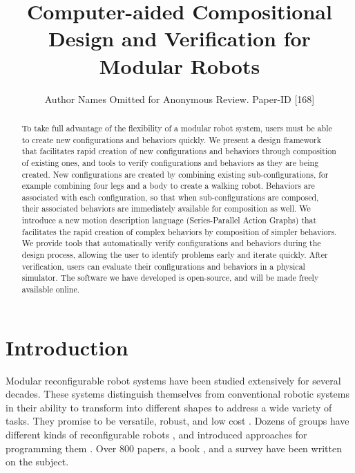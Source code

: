 \documentclass[conference]{IEEEtran}
\theoremstyle{definition}
\begin{document}
\title{Computer-aided Compositional Design and Verification for Modular Robots}

\author{Author Names Omitted for Anonymous Review. Paper-ID [168]}

\maketitle

\begin{abstract}
To take full advantage of the flexibility of a modular robot system, users must be
able to create new configurations and behaviors quickly. We present a design framework  that facilitates  rapid creation
of new configurations and behaviors through composition of existing ones, and tools
to verify configurations and behaviors as they are being created.
New configurations are created by combining existing
sub-configurations,
for example combining four legs and a body to create a walking robot.
Behaviors are associated with each configuration, so that when sub-configurations
are composed, their associated behaviors are immediately available for composition
as well.
We introduce a new motion description language (Series-Parallel Action Graphs)
that facilitates the rapid creation of complex behaviors by composition of simpler
behaviors.
We provide tools that automatically verify configurations and behaviors during the
design process, allowing the user to identify problems early and iterate quickly.
After verification, users can  evaluate their configurations and behaviors in a physical simulator.
The software we have developed is open-source, and will be made freely available
online.
\end{abstract}

\section{Introduction}
Modular reconfigurable robot systems have been studied extensively for several
decades.  These systems distinguish themselves from conventional robotic systems in their
ability to transform into different shapes to address a wide variety of tasks. They
promise to be versatile, robust, and low cost \cite{yim2000polybot}. Dozens of groups
have different kinds of reconfigurable robots \cite{fukuda1990cellular, lipson2000towards}, and introduced approaches
for programming them \cite{salemi2001hormone, walter2002choosing, melek2003neurofuzzy}.  Over 800 papers, a book \cite{stoy2010book}, and a survey \cite{yim2007modular}
have been written on the subject.
\end{document}
